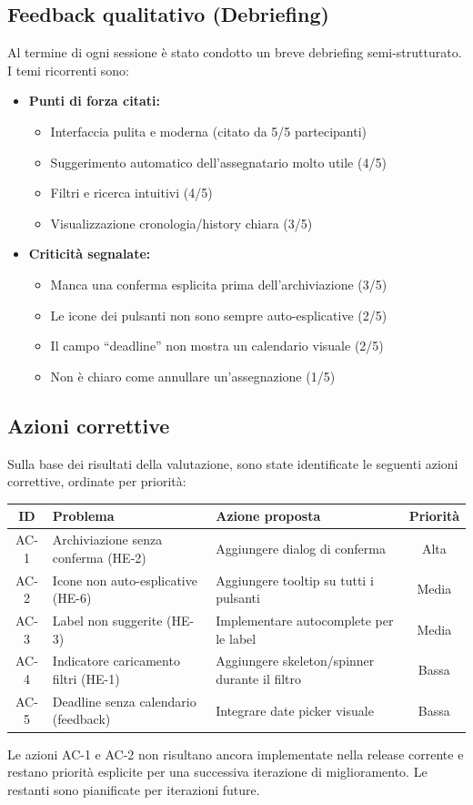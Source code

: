 ﻿\documentclass[a4paper,11pt]{article}
\begin{document}
\subsection{Feedback qualitativo (Debriefing)}

Al termine di ogni sessione \`e stato condotto un breve debriefing semi-strutturato. I temi ricorrenti sono:

\begin{itemize}
  \item \textbf{Punti di forza citati:}
  \begin{itemize}
    \item Interfaccia pulita e moderna (citato da 5/5 partecipanti)
    \item Suggerimento automatico dell'assegnatario molto utile (4/5)
    \item Filtri e ricerca intuitivi (4/5)
    \item Visualizzazione cronologia/history chiara (3/5)
  \end{itemize}
  \item \textbf{Criticit\`a segnalate:}
  \begin{itemize}
    \item Manca una conferma esplicita prima dell'archiviazione (3/5)
    \item Le icone dei pulsanti non sono sempre auto-esplicative (2/5)
    \item Il campo ``deadline'' non mostra un calendario visuale (2/5)
    \item Non \`e chiaro come annullare un'assegnazione (1/5)
  \end{itemize}
\end{itemize}

\subsection{Azioni correttive}

Sulla base dei risultati della valutazione, sono state identificate le seguenti azioni correttive, ordinate per priorit\`a:

\begin{tabular}{|c|l|l|c|}
\hline
\textbf{ID} & \textbf{Problema} & \textbf{Azione proposta} & \textbf{Priorit\`a} \\
\hline
AC-1 & Archiviazione senza conferma (HE-2) & Aggiungere dialog di conferma & Alta \\
\hline
AC-2 & Icone non auto-esplicative (HE-6) & Aggiungere tooltip su tutti i pulsanti & Media \\
\hline
AC-3 & Label non suggerite (HE-3) & Implementare autocomplete per le label & Media \\
\hline
AC-4 & Indicatore caricamento filtri (HE-1) & Aggiungere skeleton/spinner durante il filtro & Bassa \\
\hline
AC-5 & Deadline senza calendario (feedback) & Integrare date picker visuale & Bassa \\
\hline
\end{tabular}

\vspace{0.3cm}
\noindent Le azioni AC-1 e AC-2 non risultano ancora implementate nella release corrente e restano priorit\`a esplicite per una successiva iterazione di miglioramento. Le restanti sono pianificate per iterazioni future.
\end{document}
